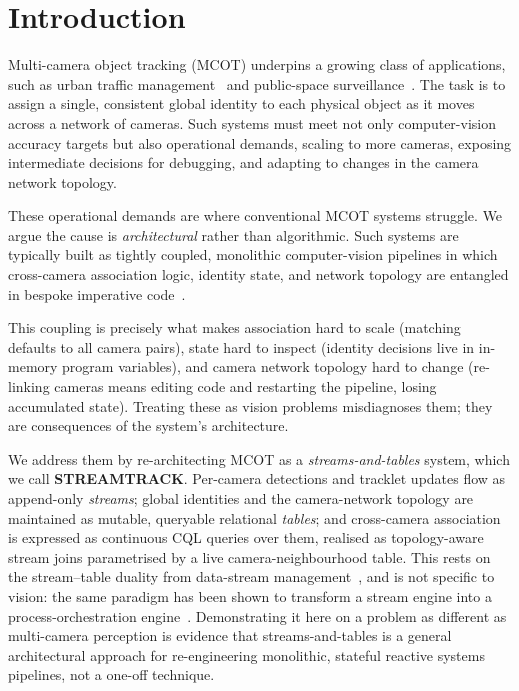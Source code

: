 \documentclass[5p,times]{elsarticle}
\begin{document}
\section{Introduction}
\label{sec:intro}

Multi-camera object tracking (MCOT) underpins a growing class of applications, such as urban traffic management~\cite{9151096} and public-space surveillance~\cite{thirde2006multi,bhuyan2007tracking}.
The task is to assign a single,
consistent global identity to each physical object as it moves across a network of cameras. Such systems must meet not only computer-vision accuracy targets but also operational
demands, scaling to more cameras, exposing intermediate decisions for debugging, and adapting to changes in the camera network topology.

These operational demands are where conventional MCOT systems struggle. We argue the cause is \emph{architectural} rather than algorithmic. Such systems are typically built as tightly coupled,
monolithic computer-vision pipelines in which cross-camera association logic, identity state, and
network topology are entangled in bespoke imperative code~\cite{yoshida2024overlap,kim2024cluster,xie2024robust}. %

This coupling is precisely what makes association hard to scale (matching defaults to all camera pairs), state hard to inspect (identity decisions live in in-memory program variables), and camera network topology hard to change (re-linking cameras means editing code and restarting the pipeline, losing accumulated state). Treating these as vision problems misdiagnoses them; they are consequences of the system's architecture.

We address them by re-architecting MCOT as a \emph{streams-and-tables} system, which we call \textbf{STREAMTRACK}. Per-camera detections and tracklet updates flow as append-only \emph{streams}; global identities and the
camera-network topology are maintained as mutable, queryable relational \emph{tables}; and cross-camera association is expressed as continuous CQL queries over them, realised as
topology-aware stream joins parametrised by a live camera-neighbourhood table. This rests on the
stream--table duality from data-stream management~\cite{sax2018streams,DBLP:conf/dbpl/ArasuBW03},
and is not specific to vision: the same paradigm has been shown to transform a stream engine into a process-orchestration engine~\cite{awad2025best}. Demonstrating it here on a problem as different as multi-camera perception is evidence that streams-and-tables is a general architectural approach for re-engineering monolithic, stateful reactive systems pipelines, not a one-off technique.
\end{document}
